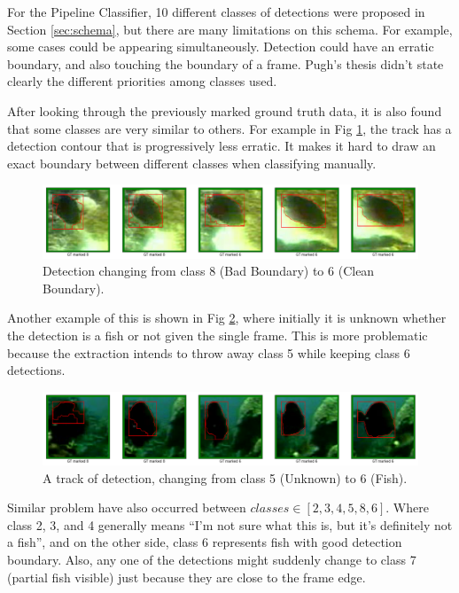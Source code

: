 \documentclass[bsc,frontabs,twoside,fullspacing,parskip,deptreport]{infthesis}
\begin{document}
For the Pipeline Classifier, 10 different classes of detections were proposed in Section \ref{sec:schema}, but there are many limitations on this schema.
For example, some cases could be appearing simultaneously. Detection could have an erratic boundary, and also touching the boundary of a frame. Pugh's thesis didn't state clearly the different priorities among classes used. 

After looking through the previously marked ground truth data, it is also found that some classes are very similar to others. For example in Fig \ref{fig:class68}, the track has a detection contour that is progressively less erratic. It makes it hard to draw an exact boundary between different classes when classifying manually.

\begin{figure}[h]
\centering
    \includegraphics[scale=0.34]{graph/6-8.png}
    \caption{Detection changing from class 8 (Bad Boundary) to 6 (Clean Boundary).}
    \label{fig:class68}
\end{figure}

Another example of this is shown in Fig \ref{fig:class56}, where initially it is unknown whether the detection is a fish or not given the single frame. This is more problematic because the extraction intends to throw away class 5 while keeping class 6 detections. 

\begin{figure}[ht]
\centering
    \includegraphics[scale=0.34]{graph/5-6.png}
    \caption{A track of detection, changing from class 5 (Unknown) to 6 (Fish).}
    \label{fig:class56}
\end{figure}

Similar problem have also occurred between \(classes\in[2,3,4,5,8,6]\). Where class 2, 3, and 4 generally means ``I'm not sure what this is, but it's definitely not a fish'', and on the other side, class 6 represents fish with good detection boundary. 
Also, any one of the detections might suddenly change to class 7 (partial fish visible) just because they are close to the frame edge. 
\end{document}
